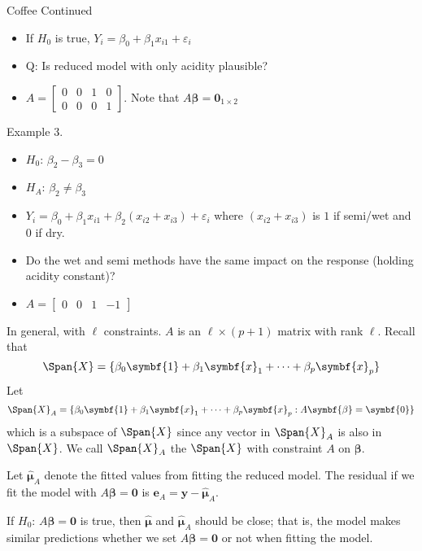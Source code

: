 \begin{Example}{Coffee Continued}{}
\begin{itemize}
        \item If $ H_0 $ is true, $ Y_i=\beta_0+\beta_1x_{i1}+\varepsilon_i $
        \item Q\@: Is reduced model with only acidity plausible?
        \item $ A=\begin{bmatrix}
                      0 & 0 & 1 & 0 \\
                      0 & 0 & 0 & 1
                  \end{bmatrix} $. Note that $ A\symbf{\beta}=\symbf{0}_{1\times 2} $
    \end{itemize}
    Example 3.
    \begin{itemize}
        \item $ H_0 $: $ \beta_2-\beta_3=0 $
        \item $ H_A $: $ \beta_2\neq \beta_3 $
        \item $ Y_i=\beta_0+\beta_1x_{i1}+\beta_2(x_{i2}+x_{i3})+\varepsilon_i $
              where $ (x_{i2}+x_{i3}) $ is
              $ 1 $ if semi/wet and $ 0 $ if dry.
        \item Do the wet and semi methods have the same impact
              on the response (holding acidity constant)?
        \item $ A=\begin{bmatrix}
                      0 & 0 & 1 & -1
                  \end{bmatrix} $
    \end{itemize}
\end{Example}

In general, with $ \ell $ constraints. $ A $
is an $ \ell \times (p+1) $ matrix
with rank $ \ell $. Recall
that
\[ \Span{X}=\set{\beta_0\symbf{1}+\beta_1\symbf{x}_1+
        \cdots+\beta_p\symbf{x}_p} \]
Let
\[ \Span{X}_A=\set{\beta_0\symbf{1}+\beta_1\symbf{x}_1+
        \cdots+\beta_p\symbf{x}_p:A\symbf{\beta}=\symbf{0}} \]
which is a subspace of $ \Span{X} $
since any vector in $ \Span{X}_A $
is also in $ \Span{X} $.
We call $ \Span{X}_A $ the
$ \Span{X} $ with constraint $ A $ on $ \symbf{\beta} $.

Let $ \hat{\symbf{\mu}}_A $
denote the fitted values from fitting the reduced model.
The residual if we fit the model with $ A\symbf{\beta}=\symbf{0} $
is $ \symbf{e}_A=\symbf{y}-\hat{\symbf{\mu}}_A $.

If $ H_0 $: $ A\symbf{\beta}=\symbf{0} $ is true, then
$ \hat{\symbf{\mu}} $ and $ \hat{\symbf{\mu}}_A $ should be close;
that is, the model makes similar predictions whether
we set $ A\symbf{\beta}=\symbf{0} $ or not when fitting the model.

